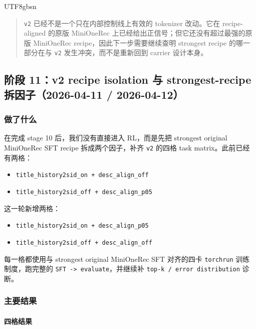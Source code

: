 \documentclass[11pt]{article}
\begin{document}
\begin{CJK*}{UTF8}{gbsn}
\begin{quote}
\texttt{v2} 已经不是一个只在内部控制线上有效的 tokenizer 改动。它在 recipe-aligned 的原版 MiniOneRec 上已经给出正信号；但它还没有超过最强的原版 MiniOneRec recipe，因此下一步需要继续查明 strongest recipe 的哪一部分在与 \texttt{v2} 发生冲突，而不是重新回到 carrier 设计本身。
\end{quote}

\subsection{阶段 11：v2 recipe isolation 与 strongest-recipe 拆因子（2026-04-11 / 2026-04-12）}

\subsubsection*{做了什么}

在完成 stage 10 后，我们没有直接进入 RL，而是先把 strongest original MiniOneRec SFT recipe 拆成两个因子，补齐 \texttt{v2} 的四格 task matrix。此前已经有两格：

\begin{itemize}
  \item \texttt{title\_history2sid\_on + desc\_align\_off}
  \item \texttt{title\_history2sid\_off + desc\_align\_p05}
\end{itemize}

这一轮新增两格：

\begin{itemize}
  \item \texttt{title\_history2sid\_on + desc\_align\_p05}
  \item \texttt{title\_history2sid\_off + desc\_align\_off}
\end{itemize}

每一格都使用与 strongest original MiniOneRec SFT 对齐的四卡 \texttt{torchrun} 训练制度，跑完整的 \texttt{SFT -> evaluate}，并继续补 \texttt{top-k / error distribution} 诊断。

\subsubsection*{主要结果}

\paragraph{四格结果}


\end{CJK*}
\end{document}
